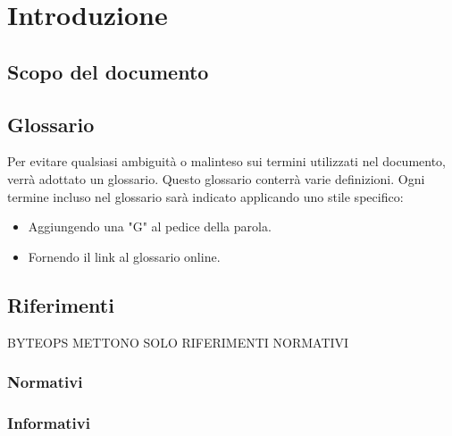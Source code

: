 \section{Introduzione}
\setcounter{subsection}{0}
\subsection{Scopo del documento}

\subsection{Glossario}
Per evitare qualsiasi ambiguità o malinteso sui termini utilizzati nel documento, verrà adottato un glossario. Questo glossario conterrà varie definizioni. Ogni termine incluso nel glossario sarà indicato applicando uno stile specifico:
\begin{itemize}
    \item Aggiungendo una "G" al pedice della parola.
    \item Fornendo il link al glossario online.
\end{itemize}

\subsection{Riferimenti} BYTEOPS METTONO SOLO RIFERIMENTI NORMATIVI
    \subsubsection{Normativi}
        
    \subsubsection{Informativi}
       
